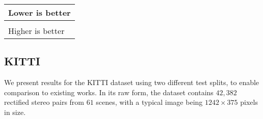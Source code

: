 \documentclass[10pt,twocolumn,letterpaper]{article}
\makeatletter
\newcommand*{\ea}{et al.\@\xspace}
\makeatother
\begin{document}
\begin{table*}[t]
{  \begin{tabular}{|l|}
    \hline
      \cellcolor{col1} Lower is better\\ \hline
      \\ \hline
      \cellcolor{col2} Higher is better\\ \hline   
  \end{tabular}
  
  }
  \vspace{10pt}
  \caption{Results on KITTI 2015 \cite{Geiger2012CVPR} using the split of Eigen \ea\cite{eigen2014depth}. 
  For training, K is the KITTI dataset \cite{Geiger2012CVPR} and CS is Cityscapes \cite{Cordts2016Cityscapes}.
  The predictions of Liu \ea\cite{liu2015learning}\mbox{*} are generated on a mix of the left and right images instead of just the left input images. 
  For a fair comparison, we compute their results relative to the correct image.
  As in the provided source code, Eigen \ea\cite{eigen2014depth}$^{\circ}$ results are computed relative to the velodyne instead of the camera. 
  Garg \ea\cite{garg2016unsupervised} results are taken directly from their paper. All results, except \cite{eigen2014depth}, use the crop from \cite{garg2016unsupervised}.
  We also show our results with the same crop and maximum evaluation distance. The last two rows are computed on the uncropped ground truth.}
    \label{tab:kitti_eigen}
    \vspace{-10pt}
\end{table*}


\subsection{KITTI}
We present results for the KITTI dataset \cite{Geiger2012CVPR} using two different test splits, to enable comparison to existing works. 
In its raw form, the dataset contains $42,382$ rectified stereo pairs from $61$ scenes, with a typical image being $1242\times375$ pixels in size.
\end{document}
